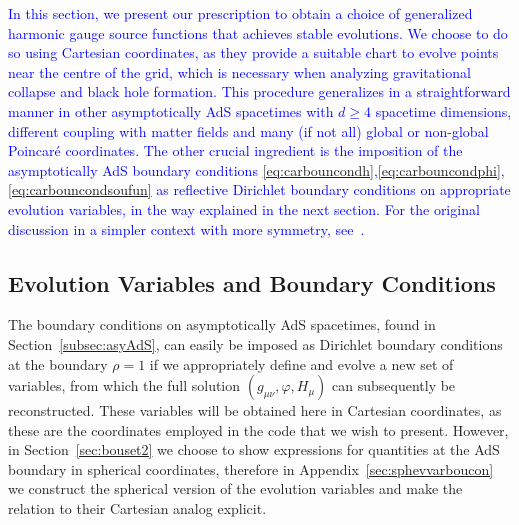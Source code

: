 \documentclass[a4paper,11pt]{article}
\numberwithin{equation}{section}
\begin{document}
\textcolor{blue}{In this section, we present our prescription to obtain a choice of generalized harmonic gauge source functions that achieves stable evolutions.
We choose to do so using Cartesian coordinates, as they provide a suitable chart to evolve points near the centre of the grid, which is necessary when analyzing gravitational collapse and black hole formation. This procedure generalizes in a straightforward manner in other asymptotically AdS spacetimes with $d\geq 4$ spacetime dimensions, different coupling with matter fields and many (if not all) global or non-global Poincar\'{e} coordinates.
The other crucial ingredient is the imposition of the asymptotically AdS boundary conditions \eqref{eq:carbouncondh},\eqref{eq:carbouncondphi},\eqref{eq:carbouncondsoufun} as reflective Dirichlet boundary conditions on appropriate evolution variables, in the way explained in the next section.
For the original discussion in a simpler context with more symmetry, see~\cite{Bantilan:2012vu}. }

\subsection{Evolution Variables and Boundary Conditions}\label{subsec:cartevvarboucon}

The boundary conditions on asymptotically AdS spacetimes, found in Section~\ref{subsec:asyAdS}, can easily be imposed as Dirichlet boundary conditions at the boundary $\rho=1$ if we appropriately define and evolve a new set of variables, from which the full solution $(g_{\mu\nu},\varphi,H_\mu)$ can subsequently be reconstructed. %
These variables will be obtained here in Cartesian coordinates, as these are the coordinates employed in the code that we wish to present. However, in Section~\ref{sec:bouset2} we choose to show expressions for quantities at the AdS boundary in spherical coordinates, therefore in Appendix~\ref{sec:sphevvarboucon} we construct the spherical version of the evolution variables and make the relation to their Cartesian analog explicit.
\end{document}

